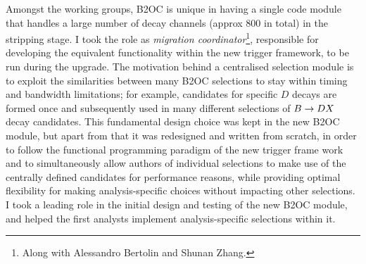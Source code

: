 Amongst the working groups, B2OC is unique in having a single code module that handles a large number of decay channels (approx 800 in total) in the stripping stage. I took the role as \emph{migration coordinator}\footnote{Along with Alessandro Bertolin and Shunan Zhang.}, responsible for developing the equivalent functionality within the new trigger framework, to be run during the \lhcb upgrade. The motivation behind a centralised selection module is to exploit the similarities between many B2OC selections to stay within timing and bandwidth limitations; for example, candidates for specific $D$ decays are formed once and subsequently used in many different selections of ${B}\rightarrow{\ensuremath{D}} X$ decay candidates. This fundamental design choice was kept in the new B2OC module, but apart from that it was redesigned and written from scratch, in order to follow the functional programming paradigm of the new trigger frame work and to simultaneously allow authors of individual selections to make use of the centrally defined candidates for performance reasons, while providing optimal flexibility for making analysis-specific choices without impacting other selections. I took a leading role in the initial design and testing of the new B2OC module, and helped the first analysts implement analysis-specific selections within it.


